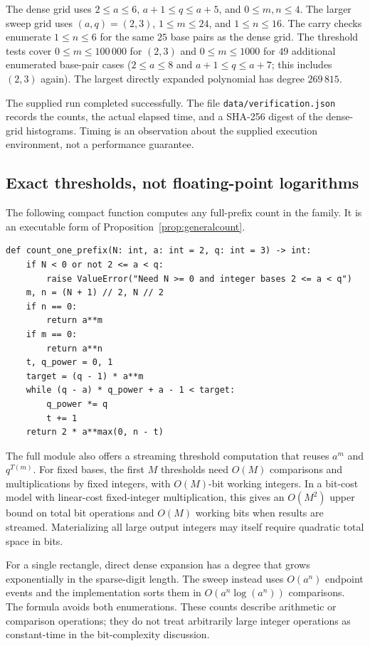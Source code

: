 \documentclass[11pt,letterpaper]{article}
\numberwithin{equation}{section}
\theoremstyle{definition}
\theoremstyle{remark}
\begin{document}
The dense grid uses $2\le a\le6$, $a+1\le q\le a+5$, and
$0\le m,n\le4$. The larger sweep grid uses $(a,q)=(2,3)$,
$1\le m\le24$, and $1\le n\le16$. The carry checks enumerate
$1\le n\le6$ for the same $25$ base pairs as the dense grid.
The threshold tests cover $0\le m\le100\,000$ for $(2,3)$ and
$0\le m\le1000$ for $49$ additional enumerated base-pair cases
($2\le a\le8$ and $a+1\le q\le a+7$; this includes $(2,3)$ again).
The largest directly expanded polynomial has degree $269\,815$.

The supplied run completed successfully. The file
\texttt{data/verification.json} records the counts, the actual elapsed time,
and a SHA-256 digest of the dense-grid histograms. Timing is an observation
about the supplied execution environment, not a performance guarantee.

\subsection{Exact thresholds, not floating-point logarithms}
The following compact function computes any full-prefix count in the
family. It is an executable form of Proposition~\ref{prop:generalcount}.
\begin{lstlisting}
def count_one_prefix(N: int, a: int = 2, q: int = 3) -> int:
    if N < 0 or not 2 <= a < q:
        raise ValueError("Need N >= 0 and integer bases 2 <= a < q")
    m, n = (N + 1) // 2, N // 2
    if n == 0:
        return a**m
    if m == 0:
        return a**n
    t, q_power = 0, 1
    target = (q - 1) * a**m
    while (q - a) * q_power + a - 1 < target:
        q_power *= q
        t += 1
    return 2 * a**max(0, n - t)
\end{lstlisting}
The full module also offers a streaming threshold computation that reuses
$a^m$ and $q^{T(m)}$. For fixed bases, the first $M$ thresholds need
$O(M)$ comparisons and multiplications by fixed integers, with $O(M)$-bit
working integers. In a bit-cost model with linear-cost fixed-integer
multiplication, this gives an $O(M^2)$ upper bound on total bit operations
and $O(M)$ working bits when results are streamed. Materializing all large
output integers may itself require quadratic total space in bits.

For a single rectangle, direct dense expansion has a degree that grows
exponentially in the sparse-digit length. The sweep instead uses
$O(a^n)$ endpoint events and the implementation sorts them in
$O(a^n\log(a^n))$ comparisons. The formula avoids both enumerations.
These counts describe arithmetic or comparison operations; they do not
treat arbitrarily large integer operations as constant-time in the
bit-complexity discussion.
\end{document}
